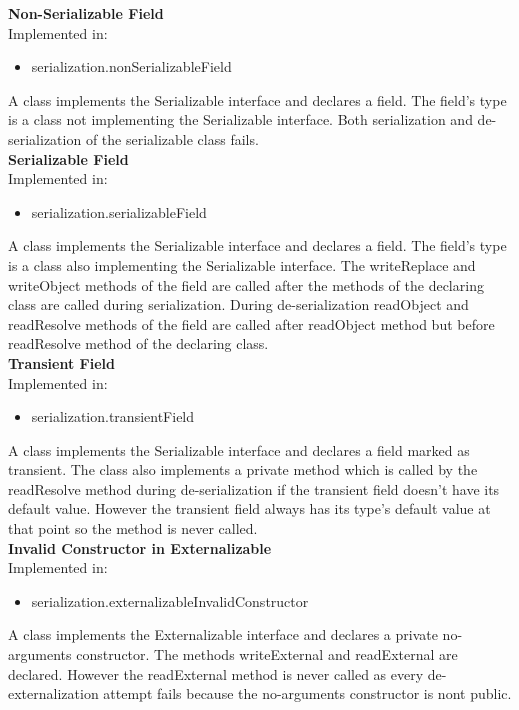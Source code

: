 \documentclass{article}
\begin{document}
\noindent
\textbf{Non-Serializable Field}\\
Implemented in: 
\begin{itemize}
    \item serialization.nonSerializableField
\end{itemize}
A class implements the Serializable interface and declares a field. The field's type is a class not implementing the Serializable interface. Both serialization and de-serialization of the serializable class fails.\\

\noindent
\textbf{Serializable Field}\\
Implemented in: 
\begin{itemize}
    \item serialization.serializableField
\end{itemize}
A class implements the Serializable interface and declares a field. The field's type is a class also implementing the Serializable interface. The writeReplace and writeObject methods of the field are called after the methods of the declaring class are called during serialization. During de-serialization readObject and readResolve methods of the field are called after readObject method but before readResolve method of the declaring class.\\

\noindent
\textbf{Transient Field}\\
Implemented in: 
\begin{itemize}
    \item serialization.transientField
\end{itemize}
A class implements the Serializable interface and declares a field marked as transient. The class also implements a private method which is called by the readResolve method during de-serialization if the transient field doesn't have its default value. However the transient field always has its type's default value at that point so the method is never called.\\

\noindent
\textbf{Invalid Constructor in Externalizable}\\
Implemented in: 
\begin{itemize}
    \item serialization.externalizableInvalidConstructor
\end{itemize}
A class implements the Externalizable interface and declares a private no-arguments constructor. The methods writeExternal and readExternal are declared. However the readExternal method is never called as every de-externalization attempt fails because the no-arguments constructor is nont public.\\
\end{document}

